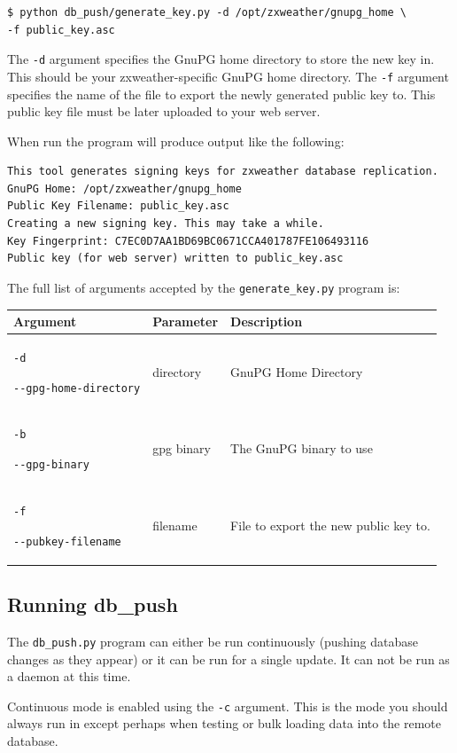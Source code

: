 \documentclass[a4paper,10pt,draft]{book}
\begin{document}
\begin{verbatim}
$ python db_push/generate_key.py -d /opt/zxweather/gnupg_home \
-f public_key.asc
\end{verbatim}

The \verb|-d| argument specifies the GnuPG home directory to store the new key in. This should be your zxweather-specific GnuPG home directory. The \verb|-f| argument specifies the name of the file to export the newly generated public key to. This public key file must be later uploaded to your web server.

When run the program will produce output like the following:
\begin{verbatim}
This tool generates signing keys for zxweather database replication.
GnuPG Home: /opt/zxweather/gnupg_home
Public Key Filename: public_key.asc
Creating a new signing key. This may take a while.
Key Fingerprint: C7EC0D7AA1BD69BC0671CCA401787FE106493116
Public key (for web server) written to public_key.asc
\end{verbatim}

The full list of arguments accepted by the \verb|generate_key.py| program is:

\begin{tabular}{p{4.2cm} l p{7.9cm}}
\hline
\textbf{Argument} & \textbf{Parameter} & \textbf{Description} \\
\hline

\verb|-d| \par \verb|--gpg-home-directory| & directory & GnuPG Home Directory \\

\verb|-b| \par \verb|--gpg-binary| & gpg binary & The GnuPG binary to use \\

\verb|-f| \par \verb|--pubkey-filename| & filename & File to export the new public key to. \\
\hline
\end{tabular}


\subsection{Running db\_push}

The \verb|db_push.py| program can either be run continuously (pushing database changes as they appear) or it can be run for a single update. It can not be run as a daemon at this time.

Continuous mode is enabled using the \verb|-c| argument. This is the mode you should always run in except perhaps when testing or bulk loading data into the remote database.
\end{document}
